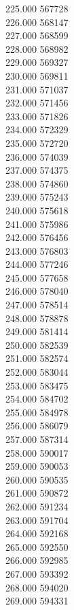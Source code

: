 { 225.000	567728 \\
 226.000	568147 \\
 227.000	568599 \\
 228.000	568982 \\
 229.000	569327 \\
 230.000	569811 \\
 231.000	571037 \\
 232.000	571456 \\
 233.000	571826 \\
 234.000	572329 \\
 235.000	572720 \\
 236.000	574039 \\
 237.000	574375 \\
 238.000	574860 \\
 239.000	575243 \\
 240.000	575618 \\
 241.000	575986 \\
 242.000	576456 \\
 243.000	576803 \\
 244.000	577246 \\
 245.000	577658 \\
 246.000	578040 \\
 247.000	578514 \\
 248.000	578878 \\
 249.000	581414 \\
 250.000	582539 \\
 251.000	582574 \\
 252.000	583044 \\
 253.000	583475 \\
 254.000	584702 \\
 255.000	584978 \\
 256.000	586079 \\
 257.000	587314 \\
 258.000	590017 \\
 259.000	590053 \\
 260.000	590535 \\
 261.000	590872 \\
 262.000	591234 \\
 263.000	591704 \\
 264.000	592168 \\
 265.000	592550 \\
 266.000	592985 \\
 267.000	593392 \\
 268.000	594020 \\
 269.000	594331 \\
}
